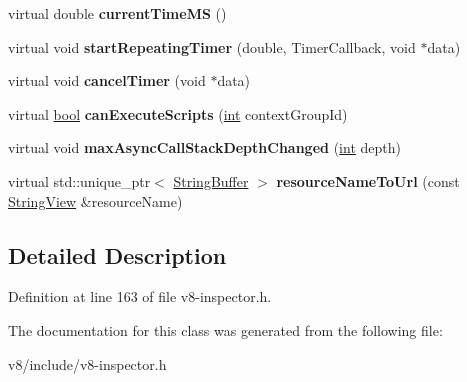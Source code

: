 \begin{DoxyCompactItemize}
\mbox{\label{classv8__inspector_1_1V8InspectorClient_ac27be4891cda5413f6156df6c98dc831}} 
virtual double {\bfseries current\+Time\+MS} ()
\item 
\mbox{\label{classv8__inspector_1_1V8InspectorClient_a33a58cb593cb4a4fefae32ec2c23ac72}} 
virtual void {\bfseries start\+Repeating\+Timer} (double, Timer\+Callback, void $\ast$data)
\item 
\mbox{\label{classv8__inspector_1_1V8InspectorClient_afb117003d8793ca5fdf3a7aabd909936}} 
virtual void {\bfseries cancel\+Timer} (void $\ast$data)
\item 
\mbox{\label{classv8__inspector_1_1V8InspectorClient_a889174cfb82aee1148e61b9fe3801605}} 
virtual \mbox{\hyperlink{classbool}{bool}} {\bfseries can\+Execute\+Scripts} (\mbox{\hyperlink{classint}{int}} context\+Group\+Id)
\item 
\mbox{\label{classv8__inspector_1_1V8InspectorClient_afdb594d52d1a1dfc751f11dbcf2166bf}} 
virtual void {\bfseries max\+Async\+Call\+Stack\+Depth\+Changed} (\mbox{\hyperlink{classint}{int}} depth)
\item 
\mbox{\label{classv8__inspector_1_1V8InspectorClient_a7db967e0049f3935b83de0788d111497}} 
virtual std\+::unique\+\_\+ptr$<$ \mbox{\hyperlink{classv8__inspector_1_1StringBuffer}{String\+Buffer}} $>$ {\bfseries resource\+Name\+To\+Url} (const \mbox{\hyperlink{classv8__inspector_1_1StringView}{String\+View}} \&resource\+Name)
\end{DoxyCompactItemize}


\subsection{Detailed Description}


Definition at line 163 of file v8-\/inspector.\+h.



The documentation for this class was generated from the following file\+:\begin{DoxyCompactItemize}
\item 
v8/include/v8-\/inspector.\+h\end{DoxyCompactItemize}

